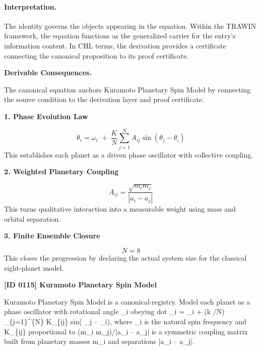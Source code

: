 \paragraph{Interpretation.}
The identity governs the objects appearing in the equation. Within the TRAWIN framework, the equation functions as the generalized carrier for the entry’s information content. In CHL terms, the derivation provides a certificate connecting the canonical proposition to its proof certificate.

\par\vspace{0.35em}
\noindent\textbf{Derivable Consequences.}\quad
\begingroup
\footnotesize
\raggedright
The canonical equation anchors Kuramoto Planetary Spin Model by connecting the source condition to the derivation layer and proof certificate.
\par\endgroup

\noindent\textbf{1. Phase Evolution Law}\par
\[
\dot{\theta}_i
=
\omega_i
\;+\;
\frac{K}{N}\sum_{j=1}^{N}A_{ij}\sin(\theta_j-\theta_i)
\]
\noindent This establishes each planet as a driven phase oscillator with collective coupling.\par
\noindent\textbf{2. Weighted Planetary Coupling}\par
\[
A_{ij}=\frac{\sqrt{m_i m_j}}{|a_i-a_j|}
\]
\noindent This turns qualitative interaction into a measurable weight using mass and orbital separation.\par
\noindent\textbf{3. Finite Ensemble Closure}\par
\[
N=8
\]
\noindent This closes the progression by declaring the actual system size for the classical eight-planet model.\par

\clearpage
\noindent\textbf{[ID 0115] Kuramoto Planetary Spin Model}\par
\vspace{0.35em}
\begingroup\small
{}
Kuramoto Planetary Spin Model is a canonical-registry. Model each planet as a phase oscillator with rotational angle  \_i obeying dot  \_i =  \_i + (k /N)    \_\{j=1\}\textasciicircum{}\{N\} K\_\{ij\} sin( \_j --  \_i), where  \_i is the natural spin frequency and K\_\{ij\} proportional to (m\_i m\_j)/|a\_i -- a\_j|  is a symmetric coupling matrix built from planetary masses m\_i and separations |a\_i -- a\_j|.

